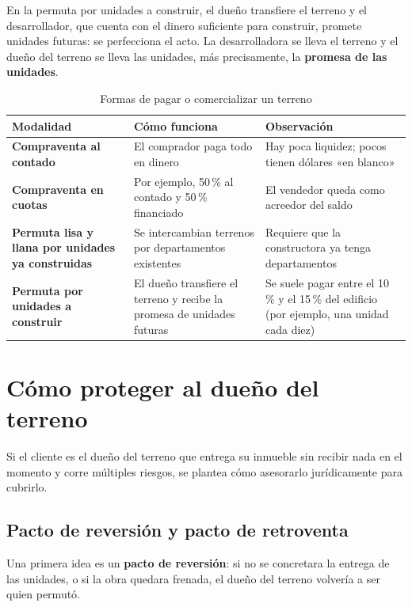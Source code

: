 \documentclass[12pt,oneside]{book}
\begin{document}
En la permuta por unidades a construir, el dueño transfiere el terreno y el desarrollador, que cuenta con el dinero suficiente para construir, promete unidades futuras: se perfecciona el acto. La desarrolladora se lleva el terreno y el dueño del terreno se lleva las unidades, más precisamente, la \textbf{promesa de las unidades}.

\begin{table}[H]
\centering
\small
\begin{tabularx}{\textwidth}{>{\raggedright\arraybackslash}p{3.6cm}YY}
\toprule
\textbf{Modalidad} & \textbf{Cómo funciona} & \textbf{Observación} \\
\midrule
\textbf{Compraventa al contado} & El comprador paga todo en dinero & Hay poca liquidez; pocos tienen dólares «en blanco» \\
\addlinespace
\textbf{Compraventa en cuotas} & Por ejemplo, 50\,\% al contado y 50\,\% financiado & El vendedor queda como acreedor del saldo \\
\addlinespace
\textbf{Permuta lisa y llana por unidades ya construidas} & Se intercambian terrenos por departamentos existentes & Requiere que la constructora ya tenga departamentos \\
\addlinespace
\textbf{Permuta por unidades a construir} & El dueño transfiere el terreno y recibe la promesa de unidades futuras & Se suele pagar entre el 10\,\% y el 15\,\% del edificio (por ejemplo, una unidad cada diez) \\
\bottomrule
\end{tabularx}
\caption{Formas de pagar o comercializar un terreno}
\end{table}

\section{Cómo proteger al dueño del terreno}

Si el cliente es el dueño del terreno que entrega su inmueble sin recibir nada en el momento y corre múltiples riesgos, se plantea cómo asesorarlo jurídicamente para cubrirlo.

\subsection{Pacto de reversión y pacto de retroventa}

Una primera idea es un \textbf{pacto de reversión}: si no se concretara la entrega de las unidades, o si la obra quedara frenada, el dueño del terreno volvería a ser quien permutó.
\end{document}
